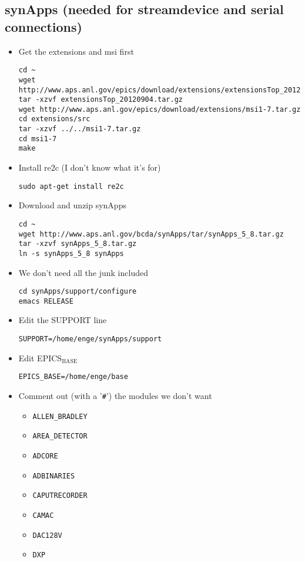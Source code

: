 \documentclass[11pt]{article}
\begin{document}
\subsection{synApps (needed for streamdevice and serial connections)}
\label{sec-1-3}
\begin{itemize}
\item Get the extensions and msi first
\begin{verbatim}
cd ~
wget http://www.aps.anl.gov/epics/download/extensions/extensionsTop_20120904.tar.gz
tar -xzvf extensionsTop_20120904.tar.gz
wget http://www.aps.anl.gov/epics/download/extensions/msi1-7.tar.gz
cd extensions/src
tar -xzvf ../../msi1-7.tar.gz
cd msi1-7
make
\end{verbatim}
\item Install re2c (I don't know what it's for)
\begin{verbatim}
sudo apt-get install re2c
\end{verbatim}
\item Download and unzip synApps
\begin{verbatim}
cd ~
wget http://www.aps.anl.gov/bcda/synApps/tar/synApps_5_8.tar.gz
tar -xzvf synApps_5_8.tar.gz
ln -s synApps_5_8 synApps
\end{verbatim}
\item We don't need all the junk included
\begin{verbatim}
cd synApps/support/configure
emacs RELEASE
\end{verbatim}
\item Edit the SUPPORT line
\begin{verbatim}
SUPPORT=/home/enge/synApps/support
\end{verbatim}
\item Edit EPICS$_{\text{BASE}}$
\begin{verbatim}
EPICS_BASE=/home/enge/base
\end{verbatim}
\item Comment out (with a '\verb~#~') the modules we don't want
\begin{itemize}
\item \verb~ALLEN_BRADLEY~
\item \verb~AREA_DETECTOR~
\item \verb~ADCORE~
\item \verb~ADBINARIES~
\item \verb~CAPUTRECORDER~
\item \verb~CAMAC~
\item \verb~DAC128V~
\item \verb~DXP~

\end{itemize}
\end{itemize}
\end{document}
